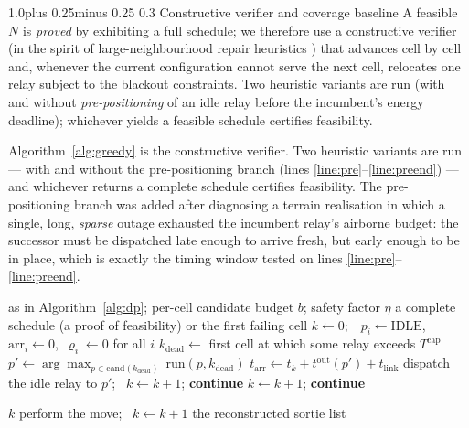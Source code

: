 \documentclass[11pt]{article}
\makeatletter
\def\subsection{\@startsection{subsection}{2}{\z@}%
    {1.0\baselineskip plus 0.25\baselineskip minus 0.25\baselineskip}%
    {0.3\baselineskip}%
    {\normalfont\normalsize\itshape}}%
\theoremstyle{dshplain}
\theoremstyle{dshdefn}
\makeatother
\begin{document}
\subsection{Constructive verifier and coverage baseline}
\label{sec:verifier}
A feasible $N$ is \emph{proved} by exhibiting a full schedule; we therefore use a
constructive verifier (in the spirit of large-neighbourhood repair heuristics
\cite{alns}) that advances cell by cell and, whenever the current
configuration cannot serve the next cell, relocates one relay subject to the
blackout constraints. Two heuristic variants are run (with and without
\emph{pre-positioning} of an idle relay before the incumbent's energy deadline);
whichever yields a feasible schedule certifies feasibility.

Algorithm~\ref{alg:greedy} is the constructive verifier. Two heuristic
variants are run --- with and without the pre-positioning branch (lines
\ref{line:pre}--\ref{line:preend}) --- and whichever returns a complete schedule
certifies feasibility. The pre-positioning branch was added after diagnosing a
terrain realisation in which a single, long, \emph{sparse} outage exhausted the
incumbent relay's airborne budget: the successor must be dispatched late enough
to arrive fresh, but early enough to be in place, which is exactly the timing
window tested on lines \ref{line:pre}--\ref{line:preend}.

\begin{algorithm}[htbp]
\caption{Constructive verifier for $N$ hovering relays}
\label{alg:greedy}
\begin{algorithmic}[1]
\Require as in Algorithm~\ref{alg:dp}; per-cell candidate budget $b$; safety factor $\eta$
\Ensure a complete schedule (a proof of feasibility) or the first failing cell
\State $k\gets0$;\ \ $p_i\gets\mathrm{IDLE}$,\ $\mathrm{arr}_i\gets0$,\ $\varrho_i\gets0$ for all $i$
    \State $k_{\mathrm{dead}}\gets$ first cell at which some relay exceeds $T^{\mathrm{cap}}$
    \label{line:pre}
      \State $p'\gets\arg\max_{p\in\mathrm{cand}(k_{\mathrm{dead}})}\ \mathrm{run}(p,k_{\mathrm{dead}})$
      \State $t_{\mathrm{arr}}\gets t_k+t^{\mathrm{out}}(p')+t_{\mathrm{link}}$
        \State dispatch the idle relay to $p'$; \ $k\gets k+1$; \textbf{continue}
      \EndIf
    \label{line:preend}
    \EndIf
    \State $k\gets k+1$; \textbf{continue}
  \EndIf
  \par
   \State \Return $k$ 
  \EndIf
  \State perform the move; \ $k\gets k+1$
\EndWhile
\State \Return the reconstructed sortie list
\end{algorithmic}
\end{algorithm}
\end{document}
